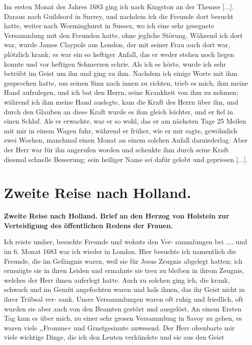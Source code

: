Im ersten Monat des Jahres 1683 ging ich nach Kingston
an der Themse [...]. Daraus nach Guildsord in Snrrey, und
nachdem ich die Freunde dort besucht hatte, weiter nach 
Worminghurst in Sussex, wo ich 
eine sehr gesegnete Versammlung
mit den Freunden hatte, ohne jegliche Störung. Während ich
dort war, wurde James Claypole aus London, der mit seiner
Frau auch dort war, plötzlich krank; es war ein so heftiger Anfall,
das er weder stehen noch liegen konnte und vor heftigen Schmerzen
schrie. Als ich es hörte, wurde ich sehr betrübt im Geist um ihn
und ging zu ihm. Nachdem ich einige Worte mit ihm gesprochen
hatte, um seinen Sinn nach innen zu richten, trieb es mich, ihm
meine Hand aufzulegen, und ich bat den Herrn, seine Krankheit
von ihm zu nehmen; während ich ihm meine Hand auslegte, kam
die Kraft des Herrn über ihn, und durch den Glauben an diese
Kraft wurde es ihm gleich leichter, und er fiel in einen Schlaf.
Als er erwachte, war er so wohl, das er am nächsten Tage
25 Meilen mit mir in einem Wagen fuhr, während er früher,
wie er mir sagte, gewöhnlich zwei Wochen, manchmal einen
Monat an einem solchen Anfall darniederlag. Aber der Herr
war für ihn angerufen worden und schenkte ihm durch seine Kraft
diesmal schnelle Besserung; sein heiliger Name sei dafür gelobt
und gepriesen [...].

\chapter[Zweite Reise nach Holland.]{Zweite Reise nach Holland.}

\begin{center}
\textbf{Zweite Reise nach Holland. Brief an den Herzog von Holstein
zur Verteidigung des öffentlichen Redens der Frauen.}
\end{center}


Ich reiste umher, besuchte Freunde und wohnte den Ver-
sammlungen bei .... und im 6. Monat 1683 war ich wieder
in London. Hier besuchte ich namentlich die Freunde, die im
Gefängnis waren, weil sie für Jesus Zeugnis abgelegt hatten;
ich ermuiigte sie in ihren Leiden und ermahnte sie treu zu bleiben
in ihrem Zeugnis, welches der Herr ihnen auferlegt hatte. Auch
zu solchen ging ich, die krank, schwach und im Gemüt angefochten
waren und hals ihnen, das ihr Geist nicht in ihrer Trübsal ver-
sank. Unsre Versammlungen waren oft ruhig und friedlich, oft
wurden sie aber auch von den Beamten gestört und ausgelöst.
An einem Ersten Tag kam es über mich, zu einer sehr grosen
Versammlung in Savoy zu gehen, es waren viele ,,Fromme« und
Grnstgesinnte anwesend. Der Herr ofsenbarte mir viele wichtige
Dinge, die ich den Leuten verkündete und sie aus den Geist


